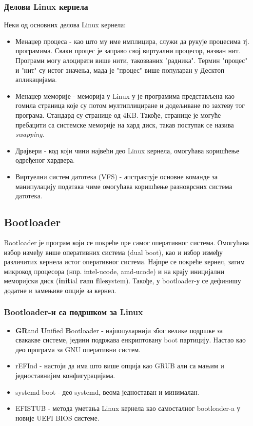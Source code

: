 \documentclass[a4paper,14pt]{article}
\begin{document}
\subsubsection{Делови Linux кернела}
Неки од основних делова Linux кернела\cite{devibm}:
\begin{itemize}
\item Менаџер процеса - као што му име имплицира, служи да рукује процесима тј. програмима. Сваки процес је заправо свој виртуални процесор, назван нит. Програми могу алоцирати више нити, такозваних "радника". Термин "процес" и "нит" су истог значења, мада је "процес" више популаран у Десктоп апликацијама.
\item Менаџер меморије - меморија у Linux-у је програмима представљена као гомила страница које су потом мултиплициране и додељиване по захтеву тог програма. Стандард су странице од 4KB. Такође, странице је могуће пребацити са системске меморије на хард диск, такав поступак се назива \textit{swapping}.
\item Драјвери - код који чини највећи део Linux кернела, омогућава коришћење одређеног хардвера.
\item Виртуелни систем датотека (VFS) - апстрактује основне команде за манипулацију података чиме омогућава коришћење разноврсних система датотека.
\end{itemize}
\newpage

\subsection{Bootloader}
Bootloader је програм који се покреће пре самог оперативног система. Омогућава избор између више оперативних система (dual boot), као и избор између различитих кернела истог оперативног система. Најпре се покреће кернел, затим микрокод процесора (нпр. intel-ucode, amd-ucode) и на крају иницијални меморијски диск (\textbf{init}ial \textbf{ram} \textbf{f}ile\textbf{s}ystem). Такође, у bootloader-у се дефинишу додатне и замењиве опције за кернел.
\subsubsection{Bootloader-и са подршком за Linux}
\begin{itemize}
\item \textbf{GR}and \textbf{U}nified \textbf{B}ootloader - најпопуларнији због велике подршке за свакакве системе, једини подржава енкриптовану boot партицију. Настао као део програма за GNU оперативни систем.
\item rEFInd - настоји да има што више опција као GRUB али са мањим и једноставнијим конфигурацијама.
\item systemd-boot - део systemd, веома једноставан и минималан.
\item EFISTUB - метода уметања Linux кернела као самосталног bootloader-a у новије UEFI BIOS системе.
\end{itemize}
\end{document}
